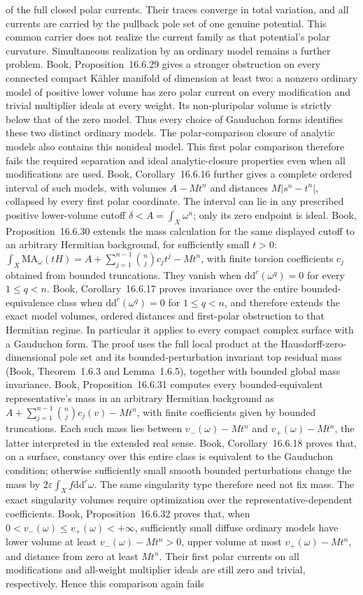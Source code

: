 \documentclass[11pt]{article}
\newcommand{\ddc}{\mathrm d\mathrm d^c}
\begin{document}
of the full closed polar currents. Their traces converge in total variation, and all currents are carried by the pullback pole set of one genuine potential. This common carrier does not realize the current family as that potential's polar curvature. Simultaneous realization by an ordinary model remains a further problem. Book, Proposition~16.6.29 gives a stronger obstruction on every connected compact K\"ahler manifold of dimension at least two: a nonzero ordinary model of positive lower volume has zero polar current on every modification and trivial multiplier ideals at every weight. Its non-pluripolar volume is strictly below that of the zero model. Thus every choice of Gauduchon forms identifies these two distinct ordinary models. The polar-comparison closure of analytic models also contains this nonideal model. This first polar comparison therefore fails the required separation and ideal analytic-closure properties even when all modifications are used. Book, Corollary~16.6.16 further gives a complete ordered interval of such models, with volumes $A-Mt^n$ and distances $M|s^n-t^n|$, collapsed by every first polar coordinate. The interval can lie in any prescribed positive lower-volume cutoff $\delta<A=\int_X\omega^n$; only its zero endpoint is ideal. Book, Proposition~16.6.30 extends the mass calculation for the same displayed cutoff to an arbitrary Hermitian background, for sufficiently small $t>0$: $\int_X\mathrm{MA}_\omega(tH)=A+\sum_{j=1}^{n-1}\binom nj c_jt^j-Mt^n$, with finite torsion coefficients $c_j$ obtained from bounded truncations. They vanish when $\ddc(\omega^q)=0$ for every $1\leq q<n$. Book, Corollary~16.6.17 proves invariance over the entire bounded-equivalence class when $\ddc(\omega^q)=0$ for $1\leq q<n$, and therefore extends the exact model volumes, ordered distances and first-polar obstruction to that Hermitian regime. In particular it applies to every compact complex surface with a Gauduchon form. The proof uses the full local product at the Hausdorff-zero-dimensional pole set and its bounded-perturbation invariant top residual mass (Book, Theorem~1.6.3 and Lemma~1.6.5), together with bounded global mass invariance. Book, Proposition~16.6.31 computes every bounded-equivalent representative's mass in an arbitrary Hermitian background as $A+\sum_{j=1}^{n-1}\binom nj c_j(v)-Mt^n$, with finite coefficients given by bounded truncations. Each such mass lies between $v_-(\omega)-Mt^n$ and $v_+(\omega)-Mt^n$, the latter interpreted in the extended real sense. Book, Corollary~16.6.18 proves that, on a surface, constancy over this entire class is equivalent to the Gauduchon condition; otherwise sufficiently small smooth bounded perturbations change the mass by $2\varepsilon\int_Xf\ddc\omega$. The same singularity type therefore need not fix mass. The exact singularity volumes require optimization over the representative-dependent coefficients. Book, Proposition~16.6.32 proves that, when $0<v_-(\omega)\leq v_+(\omega)<+\infty$, sufficiently small diffuse ordinary models have lower volume at least $v_-(\omega)-Mt^n>0$, upper volume at most $v_+(\omega)-Mt^n$, and distance from zero at least $Mt^n$. Their first polar currents on all modifications and all-weight multiplier ideals are still zero and trivial, respectively. Hence this comparison again fails 
\end{document}
